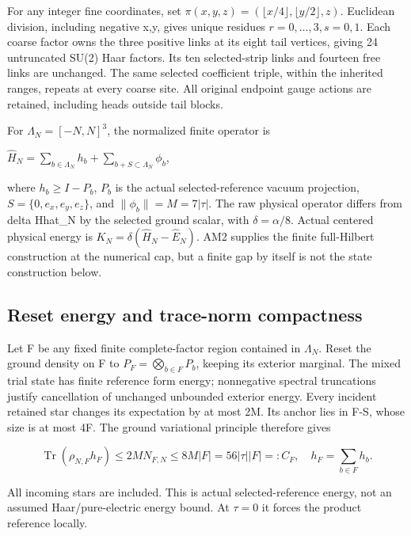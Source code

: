 For any integer fine coordinates, set \(\pi(x,y,z)=(\lfloor x/4\rfloor,\lfloor y/2\rfloor,z)\). Euclidean division, including negative x,y, gives unique residues \(r=0,\ldots,3,s=0,1\). Each coarse factor owns the three positive links at its eight tail vertices, giving 24 untruncated SU(2) Haar factors. Its ten selected-strip links and fourteen free links are unchanged. The same selected coefficient triple, within the inherited ranges, repeats at every coarse site. All original endpoint gauge actions are retained, including heads outside tail blocks.

For \(\Lambda_N=[-N,N]^{3}\), the normalized finite operator is

\(\widehat H_N=\sum_{b\in\Lambda_N}h_b+\sum_{b+S\subset\Lambda_N}\phi_b\),

where \(h_b\ge I-P_b\), \(P_b\) is the actual selected-reference vacuum projection, \(S=\{0,e_x,e_y,e_z\}\), and \(\|\phi_b\|=M=7|\tau|\). The raw physical operator differs from delta Hhat\_N by the selected ground scalar, with \(\delta=\alpha/8\). Actual centered physical energy is \(K_N=\delta(\widehat H_N-\widehat E_N)\). AM2 supplies the finite full-Hilbert construction at the numerical cap, but a finite gap by itself is not the state construction below.

\hypertarget{r29-aq1-reset-energy-and-trace-norm-compactness}{%
\subsection{Reset energy and trace-norm compactness}\label{r29:aq1:r29-aq1-reset-energy-and-trace-norm-compactness}}

Let F be any fixed finite complete-factor region contained in \(\Lambda_N\). Reset the ground density on F to \(P_F=\bigotimes_{b\in F}P_b\), keeping its exterior marginal. The mixed trial state has finite reference form energy; nonnegative spectral truncations justify cancellation of unchanged unbounded exterior energy. Every incident retained star changes its expectation by at most 2M. Its anchor lies in F-S, whose size is at most 4\textbar F\textbar. The ground variational principle therefore gives

\begin{equation}
\operatorname{Tr}(\rho_{N,F}h_F)\le2M N_{F,N}\le8M|F|=56|\tau||F|=:C_F,
\quad h_F=\sum_{b\in F}h_b.\tag{HNM-AQ1.1}
\label{r29:aq1:eq1}
\end{equation}

All incoming stars are included. This is actual selected-reference energy, not an assumed Haar/pure-electric energy bound. At \(\tau=0\) it forces the product reference locally.

